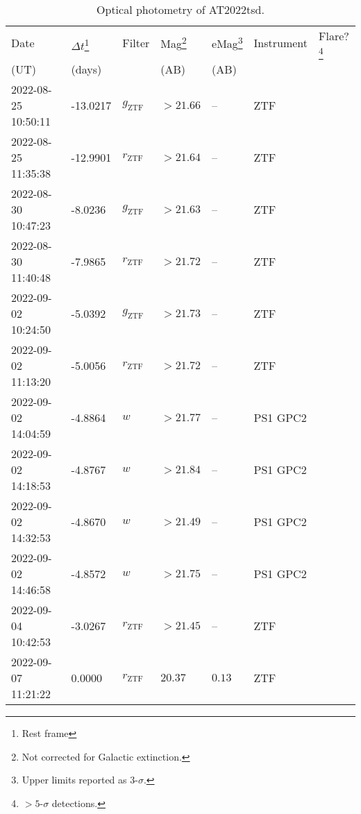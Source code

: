 \documentclass{nature_plusfigure}
\begin{document}
\clearpage

\begin{supplement}

\renewcommand{\thefigure}{Supplementary Information Figure~\arabic{figure}}
\renewcommand{\figurename}{}
\setcounter{figure}{0}
%


\renewcommand{\thetable}{Supplementary Information Table~\arabic{table}}
 \renewcommand{\tablename}{}
\setcounter{table}{0}

\begin{center} 
\begin{longtable}{lllllll} 
\caption{Optical photometry of AT2022tsd.} 
\label{tab:optical-photometry}\\ 
\hline\hline
Date & $\Delta t$\footnote{Rest frame} & Filter & Mag\footnote{Not corrected for Galactic extinction.} & eMag\footnote{Upper limits reported as 3-$\sigma$.} & Instrument & Flare?\footnote{$>5$-$\sigma$ detections.}\\ 
(UT) & (days) &  & (AB) & (AB) &  & \\ 
\hline
2022-08-25 10:50:11 & -13.0217 & ${g}_\mathrm{ZTF}$ & $>21.66$ & -- & ZTF &  \\ 
2022-08-25 11:35:38 & -12.9901 & ${r}_\mathrm{ZTF}$ & $>21.64$ & -- & ZTF &  \\ 
2022-08-30 10:47:23 & -8.0236 & ${g}_\mathrm{ZTF}$ & $>21.63$ & -- & ZTF &  \\ 
2022-08-30 11:40:48 & -7.9865 & ${r}_\mathrm{ZTF}$ & $>21.72$ & -- & ZTF &  \\ 
2022-09-02 10:24:50 & -5.0392 & ${g}_\mathrm{ZTF}$ & $>21.73$ & -- & ZTF &  \\ 
2022-09-02 11:13:20 & -5.0056 & ${r}_\mathrm{ZTF}$ & $>21.72$ & -- & ZTF &  \\ 
2022-09-02 14:04:59 & -4.8864 & $w$ & $>21.77$ & -- & PS1 GPC2 &  \\ 
2022-09-02 14:18:53 & -4.8767 & $w$ & $>21.84$ & -- & PS1 GPC2 &  \\ 
2022-09-02 14:32:53 & -4.8670 & $w$ & $>21.49$ & -- & PS1 GPC2 &  \\ 
2022-09-02 14:46:58 & -4.8572 & $w$ & $>21.75$ & -- & PS1 GPC2 &  \\ 
2022-09-04 10:42:53 & -3.0267 & ${r}_\mathrm{ZTF}$ & $>21.45$ & -- & ZTF &  \\ 
2022-09-07 11:21:22 & 0.0000 & ${r}_\mathrm{ZTF}$ & $20.37$ & $0.13$ & ZTF &  \\ 

\end{longtable}
\end{center}
\end{supplement}
\end{document}
